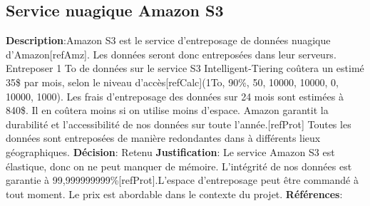 

\subsection{Service nuagique Amazon S3}
\label{s:archiver_conc2}

\textbf{Description}:Amazon S3 est le service d'entreposage de données nuagique d’Amazon[refAmz]. Les données seront donc entreposées dans leur serveurs. Entreposer 1 To de données sur le service S3 Intelligent-Tiering coûtera un estimé 35\$ par mois, selon le niveau d’accès[refCalc](1To, 90\%, 50, 10000, 10000, 0, 10000, 1000).  Les frais d’entreposage des données sur 24 mois sont estimées à 840\$. Il en coûtera moins si on utilise moins d’espace. Amazon garantit la durabilité et l'accessibilité de nos données sur toute l’année.[refProt] Toutes les données sont entreposées de manière redondantes dans à différents lieux géographiques.
\textbf{Décision}: Retenu
\textbf{Justification}:  Le service Amazon S3 est élastique, donc on ne peut manquer de mémoire. L’intégrité de nos données est garantie à 99,999999999\%[refProt].L’espace d’entreposage peut être commandé à tout moment. Le prix est abordable dans le contexte du projet.
\textbf{Références}: 
\cite{amznS3, amznProt}
